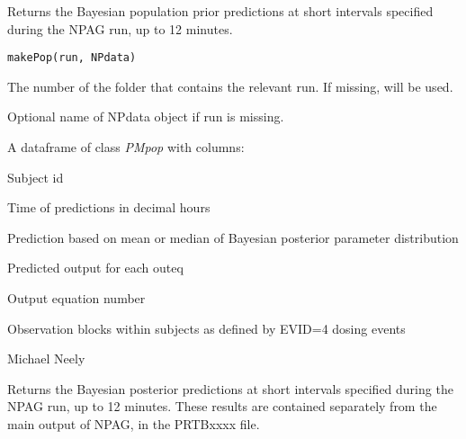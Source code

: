 \documentclass[a4paper]{book}
\begin{document}
%
\begin{Description}\relax
Returns the Bayesian population prior predictions at short intervals specified during the NPAG run,
up to 12 minutes.
\end{Description}
%
\begin{Usage}
\begin{verbatim}
makePop(run, NPdata)
\end{verbatim}
\end{Usage}
%
\begin{Arguments}
\begin{ldescription}
\item[\code{run}] The number of the folder that contains the relevant run.  If missing,  will be used.

\item[\code{NPdata}] Optional name of NPdata object if run is missing.
\end{ldescription}
\end{Arguments}
%
\begin{Value}
A dataframe of class \emph{PMpop} with columns:
\begin{ldescription}
\item[\code{id}]  Subject id
\item[\code{time}]  Time of predictions in decimal hours
\item[\code{icen}]  Prediction based on mean or median of Bayesian posterior parameter distribution
\item[\code{pred}]  Predicted output for each outeq
\item[\code{outeq}]  Output equation number
\item[\code{block}]  Observation blocks within subjects as defined by EVID=4 dosing events
\end{ldescription}
\end{Value}
%
\begin{Author}\relax
Michael Neely
\end{Author}
%
\begin{Description}\relax
Returns the Bayesian posterior predictions at short intervals specified during the NPAG run,
up to 12 minutes.  These results are contained separately from the main output of NPAG, in the
PRTBxxxx file.
\end{Description}
\end{document}
